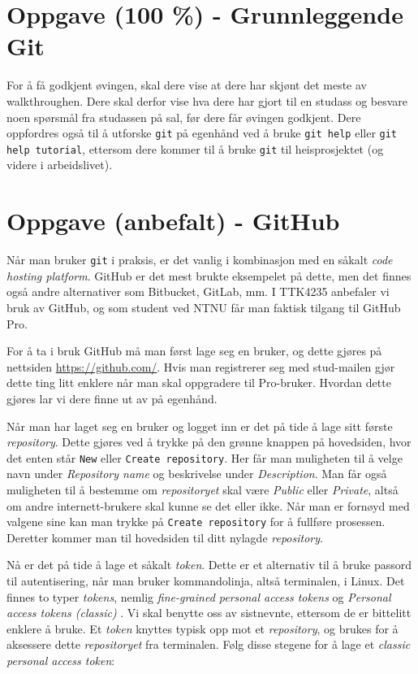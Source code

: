 





\section{Oppgave (100 \%) - Grunnleggende Git}\label{sec:2-oppgave}

For å få godkjent øvingen, skal dere vise at dere har skjønt det meste av walkthroughen. Dere skal derfor vise hva dere har gjort til en studass og besvare noen spørsmål fra studassen på sal, før dere får øvingen godkjent. Dere oppfordres også til å utforske \verb|git| på egenhånd ved å bruke \verb|git help| eller \verb|git help tutorial|, ettersom dere kommer til å bruke \verb|git| til heisprosjektet (og videre i arbeidslivet).

\section{Oppgave (anbefalt) - GitHub}
Når man bruker \verb|git| i praksis, er det vanlig i kombinasjon med en såkalt \textit{code hosting platform}. GitHub er det mest brukte eksempelet på dette, men det finnes også andre alternativer som Bitbucket, GitLab, mm. I TTK4235 anbefaler vi bruk av GitHub, og som student ved NTNU får man faktisk tilgang til GitHub Pro.

For å ta i bruk GitHub må man først lage seg en bruker, og dette gjøres på nettsiden \href{https://github.com/}{https://github.com/}. Hvis man registrerer seg med stud-mailen gjør dette ting litt enklere når man skal oppgradere til Pro-bruker. Hvordan dette gjøres lar vi dere finne ut av på egenhånd.

Når man har laget seg en bruker og logget inn er det på tide å lage sitt første \textit{repository}. Dette gjøres ved å trykke på den grønne knappen på hovedsiden, hvor det enten står \verb|New| eller \verb|Create repository|. Her får man muligheten til å velge navn under \textit{Repository name} og beskrivelse under \textit{Description}. Man får også muligheten til å bestemme om \textit{repositoryet} skal være \textit{Public} eller \textit{Private}, altså om andre internett-brukere skal kunne se det eller ikke. Når man er fornøyd med valgene sine kan man trykke på \verb|Create repository| for å fullføre prosessen. Deretter kommer man til hovedsiden til ditt nylagde \textit{repository}.

Nå er det på tide å lage et såkalt \textit{token}. Dette er et alternativ til å bruke passord til autentisering, når man bruker kommandolinja, altså terminalen, i Linux. Det finnes to typer \textit{tokens}, nemlig \textit{fine-grained personal access tokens} og \textit{Personal access tokens (classic)
}. Vi skal benytte oss av sistnevnte, ettersom de er bittelitt enklere å bruke. Et \textit{token} knyttes typisk opp mot et \textit{repository}, og brukes for å aksessere dette \textit{repositoryet} fra terminalen. Følg disse stegene for å lage et \textit{classic personal access token}:

